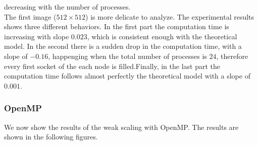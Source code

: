     decreasing with the number of processes. \\
    The first image ($512 \times 512$) is more delicate to analyze. The
    experimental results shows three different behaviors. In the first part
    the computation time is increasing with slope $0.023$, which is consistent
    enough with the theoretical model. In the second there is a sudden drop
    in the computation time, with a slope of $-0.16$, happenging when the
    total number of processes is $24$, therefore every first socket of the
    each node is filled.Finally, in the last part the computation time
    follows almost perfectly the theoretical model with a slope of $0.001$. \\

\subsubsection{OpenMP}
    We now show the results of the weak scaling with OpenMP. The results
    are shown in the following figures.
